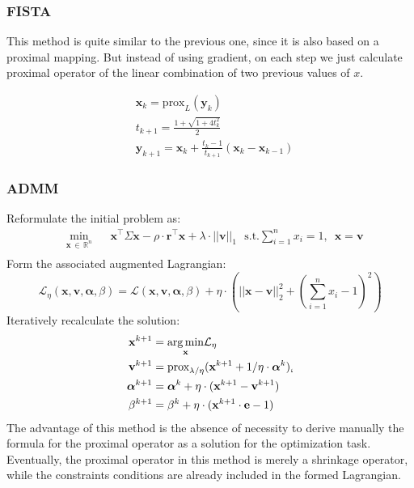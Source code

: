 \documentclass[a4paper]{article}
\DeclareMathOperator*{\argmin}{arg\,min}
\begin{document}
\subsubsection*{FISTA}
This method is quite similar to the previous one, since it is also based on a proximal mapping. But instead of using gradient, on each step we just calculate proximal operator of the linear combination of two previous values of $x$.

\begin{equation*}
\begin{aligned}
&\mathbf{x}_k = \text{prox}_{L}(\mathbf{y}_k)\\
&t_{k+1} = \frac{1 + \sqrt{1+4t_k^2}}{2}\\
&\mathbf{y}_{k+1} = \mathbf{x}_k + \frac{t_k-1}{t_{k+1}}(\mathbf{x}_k - \mathbf{x}_{k-1})
\end{aligned}
\end{equation*}

\subsubsection*{ADMM}
Reformulate the initial problem as:
\begin{equation*}
\begin{aligned}
& \underset{\mathbf{x}\,\in\,\mathbb{R}^n}{\min}
& & \mathbf{x}^\top\Sigma \mathbf{x} - \rho\cdot\mathbf{r}^\top \mathbf{x} + \lambda \cdot||\mathbf{v}||_{1} \,\,\, \,\text{s.t.} \sum\limits_{i=1}^{n}x_i = 1,\,\,\, \mathbf{x} =  \mathbf{v}\\
\end{aligned}
\end{equation*}
Form the associated augmented Lagrangian:
\begin{equation*}
\mathcal{L}_{\eta}(\mathbf{x}, \mathbf{v}, \bm{\alpha}, \beta) = \mathcal{L}(\mathbf{x}, \mathbf{v}, \bm{\alpha}, \beta) + \eta\cdot\left(||\mathbf{x}-\mathbf{v}||^2_2 + \left(\sum\limits_{i=1}^n x_i - 1\right)^2\right)
\end{equation*}
Iteratively recalculate the solution:
\begin{equation*}
\begin{aligned}
\mathbf{x}^{k+1} & = \underset{\mathbf{x}}{\argmin}\mathcal{L}_{\eta}\\
\mathbf{v}^{k+1} & = \text{prox}_{\lambda/\eta}(\mathbf{x}^{k+1}+1/\eta\cdot\bm{\alpha}^{k})\\
\bm{\alpha}^{k+1} & = \bm{\alpha}^{k}+\eta\cdot(\mathbf{x}^{k+1}-\mathbf{v}^{k+1})\\
\beta^{k+1} & = \beta^{k} + \eta\cdot(\mathbf{x}^{k+1}\cdot\mathbf{e} - 1)
\end{aligned}
`\end{equation*}
The advantage of this method is the absence of necessity to derive manually the formula for the proximal operator as a solution for the optimization task. Eventually, the proximal operator in this method is merely a shrinkage operator, while the constraints conditions are already included in the formed Lagrangian.
\end{document}
